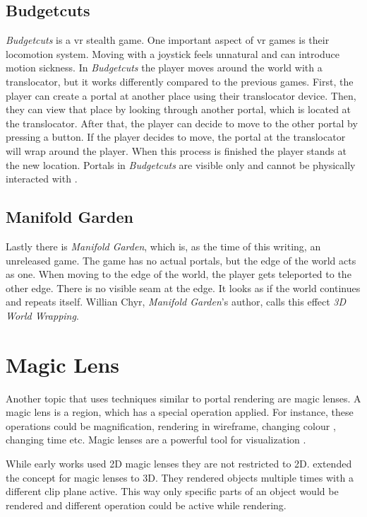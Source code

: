 \subsection{Budgetcuts}
\textit{Budgetcuts} is a \gls{vr} stealth game. One important aspect of \gls{vr} games is their locomotion system. Moving with a joystick feels unnatural and can introduce motion sickness. In \textit{Budgetcuts} the player moves around the world with a translocator, but it works differently compared to the previous games. First, the player can create a portal at another place using their translocator device. Then, they can view that place by looking through another portal, which is located at the translocator. After that, the player can decide to move to the other portal by pressing a button. If the player decides to move, the portal at the translocator will wrap around the player. When this process is finished the player stands at the new location. Portals in \textit{Budgetcuts} are visible only and cannot be physically interacted with \cite{budgetcuts, gdc:budgetcuts}.

\subsection{Manifold Garden}
Lastly there is \textit{Manifold Garden}, which is, as the time of this writing, an unreleased game. The game has no actual portals, but the edge of the world acts as one. When moving to the edge of the world, the player gets teleported to the other edge. There is no visible seam at the edge. It looks as if the world continues and repeats itself. Willian Chyr, \textit{Manifold Garden}'s author, calls this effect \textit{3D World Wrapping}.




\section{Magic Lens}
Another topic that uses techniques similar to portal rendering are magic lenses. A magic lens is a region, which has a special operation applied. For instance, these operations could be magnification, rendering in wireframe, changing colour \cite{bier:1993:toolglass}, changing time \cite{ryall:2005:temporal, tiesel:2009:composable} etc. Magic lenses are a powerful tool for visualization \cite{bier:1993:toolglass, tominski:2014:survey}.

While early works used 2D magic lenses \cite{bier:1993:toolglass} they are not restricted to 2D. \textcite{viega:1996:3d} extended the concept for magic lenses to 3D. They rendered objects multiple times with a different clip plane active. This way only specific parts of an object would be rendered and different operation could be active while rendering.

